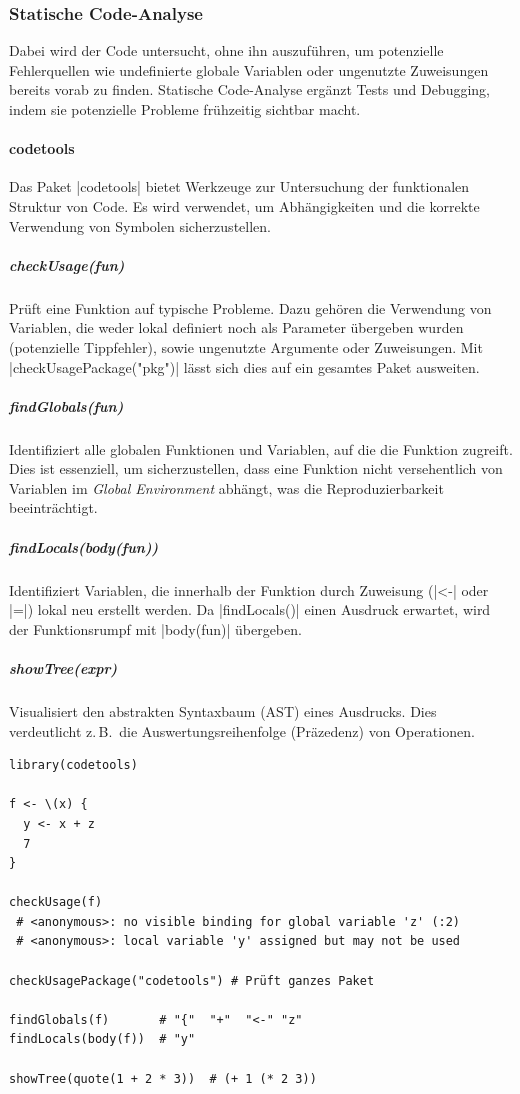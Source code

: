 \documentclass[10pt,twocolumn]{scrartcl}
\renewcommand{\lstinline}{\mycoloredinline}
\begin{document}
\subsubsection{Statische Code-Analyse}

Dabei wird der Code untersucht, ohne ihn auszuführen, um potenzielle Fehlerquellen wie undefinierte globale Variablen oder ungenutzte Zuweisungen bereits vorab zu finden. Statische Code-Analyse ergänzt Tests und Debugging, indem sie potenzielle Probleme frühzeitig sichtbar macht.

\paragraph{codetools}

Das Paket \lstinline|codetools| bietet Werkzeuge zur Untersuchung der funktionalen Struktur von Code. Es wird verwendet, um Abhängigkeiten und die korrekte Verwendung von Symbolen sicherzustellen.

\subparagraph{checkUsage(fun)}

Prüft eine Funktion auf typische Probleme. Dazu gehören die Verwendung von Variablen, die weder lokal definiert noch als Parameter übergeben wurden (potenzielle Tippfehler), sowie ungenutzte Argumente oder Zuweisungen. Mit \lstinline|checkUsagePackage("pkg")| lässt sich dies auf ein gesamtes Paket ausweiten.

\subparagraph{findGlobals(fun)}

Identifiziert alle globalen Funktionen und Variablen, auf die die Funktion zugreift. Dies ist essenziell, um sicherzustellen, dass eine Funktion nicht versehentlich von Variablen im \emph{Global Environment} abhängt, was die Reproduzierbarkeit beeinträchtigt.

\subparagraph{findLocals(body(fun))}

Identifiziert Variablen, die innerhalb der Funktion durch Zuweisung (\lstinline|<-| oder \lstinline|=|) lokal neu erstellt werden. Da \lstinline|findLocals()| einen Ausdruck erwartet, wird der Funktionsrumpf mit \lstinline|body(fun)| übergeben.

\subparagraph{showTree(expr)}

Visualisiert den abstrakten Syntaxbaum (AST) eines Ausdrucks. Dies verdeutlicht z.\,B.\ die Auswertungsreihenfolge (Präzedenz) von Operationen.

\begin{lstlisting}
library(codetools)

f <- \(x) {
  y <- x + z
  7
}

checkUsage(f)
 # <anonymous>: no visible binding for global variable 'z' (:2)
 # <anonymous>: local variable 'y' assigned but may not be used

checkUsagePackage("codetools") # Prüft ganzes Paket

findGlobals(f)       # "{"  "+"  "<-" "z"
findLocals(body(f))  # "y"

showTree(quote(1 + 2 * 3))  # (+ 1 (* 2 3))
\end{lstlisting}
\end{document}
